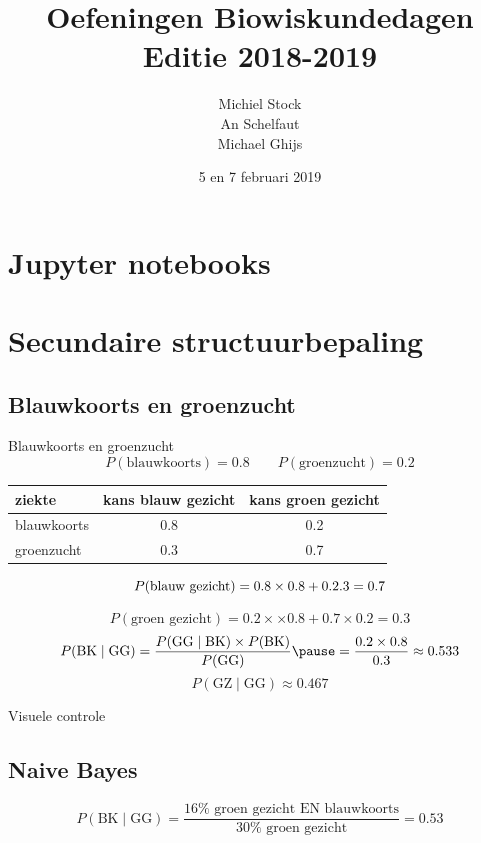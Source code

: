 \documentclass[handout]{beamer}
\title[BWD 2018-2019]{Oefeningen Biowiskundedagen\\Editie 2018-2019}
\author[Michiel, An, Micha\"el]{Michiel Stock\\An Schelfaut\\Michael Ghijs}
\date{5 en 7 februari 2019}
\begin{document}
\frame{\titlepage}
\section{Jupyter notebooks}

\section{Secundaire structuurbepaling}

\subsection{Blauwkoorts en groenzucht}

\begin{frame}{Blauwkoorts en groenzucht}
\pause
$$
P(\text{blauwkoorts}) = 0.8\quad\quad P(\text{groenzucht}) = 0.2
$$
\pause
\begin{center}
   \begin{tabular}{lcc} %
   \hline \hline
     ziekte      & kans blauw gezicht & kans groen gezicht \\
     \hline
     blauwkoorts & 0.8  & 0.2\\
     groenzucht & 0.3 & 0.7 \\
     \hline \hline
   \end{tabular}
  \end{center}
\pause
$$
P(\text{blauw gezicht}) = 0.8 \times 0.8 + 0.2\time 0.3 =0.7
$$

$$
P(\text{groen gezicht}) = 0.2\times\times 0.8 + 0.7\times0.2=0.3
$$
\pause
$$
P(\text{BK} \mid \text{GG}) =\frac{P( \text{GG}\mid\text{BK})\times P(\text{BK})}{P(\text{GG})}\pause=\frac{0.2\times 0.8}{0.3}\approx0.533
$$
\pause
$$
 P(\text{GZ} \mid \text{GG})  \approx 0.467
$$
\end{frame}

\begin{frame}{Visuele controle}

\subsection{Naive Bayes}


$$
P(\text{BK} \mid \text{GG}) =\frac{16\% \text{ groen gezicht EN blauwkoorts}}{30\% \text{ groen gezicht}} = 0.53
$$
\end{frame}
\end{document}

